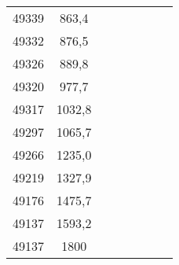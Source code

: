 \documentclass[11pt]{article}
\begin{document}
{{\begin{tabular}{|c|c|c|c|c|c|c|c|}
            \cline{1-2} 
            49339 & 863,4 &  & \multicolumn{1}{c}{} & \multicolumn{1}{c}{} & \multicolumn{1}{c}{} &  & \tabularnewline
            \cline{1-2} 
            49332 & 876,5 &  & \multicolumn{1}{c}{} & \multicolumn{1}{c}{} & \multicolumn{1}{c}{} &  & \tabularnewline
            \cline{1-2} 
            49326 & 889,8 &  & \multicolumn{1}{c}{} & \multicolumn{1}{c}{} & \multicolumn{1}{c}{} &  & \tabularnewline
            \cline{1-2} 
            49320 & 977,7 &  & \multicolumn{1}{c}{} & \multicolumn{1}{c}{} & \multicolumn{1}{c}{} &  & \tabularnewline
            \cline{1-2} 
            49317 & 1032,8 &  & \multicolumn{1}{c}{} & \multicolumn{1}{c}{} & \multicolumn{1}{c}{} &  & \tabularnewline
            \cline{1-2} 
            49297 & 1065,7 &  & \multicolumn{1}{c}{} & \multicolumn{1}{c}{} & \multicolumn{1}{c}{} &  & \tabularnewline
            \cline{1-2} 
            49266 & 1235,0 &  & \multicolumn{1}{c}{} & \multicolumn{1}{c}{} & \multicolumn{1}{c}{} &  & \tabularnewline
            \cline{1-2} 
            49219 & 1327,9 &  & \multicolumn{1}{c}{} & \multicolumn{1}{c}{} & \multicolumn{1}{c}{} &  & \tabularnewline
            \cline{1-2} 
            49176 & 1475,7 &  & \multicolumn{1}{c}{} & \multicolumn{1}{c}{} & \multicolumn{1}{c}{} &  & \tabularnewline
            \cline{1-2} 
            49137 & 1593,2 &  & \multicolumn{1}{c}{} & \multicolumn{1}{c}{} & \multicolumn{1}{c}{} &  & \tabularnewline
            \cline{1-2} 
            49137 & 1800 &  & \multicolumn{1}{c}{} & \multicolumn{1}{c}{} & \multicolumn{1}{c}{} &  & \tabularnewline
            \cline{1-2} 
        \end{tabular}
    }
}
\vspace*{\fill}\vspace*{\fill}
\end{document}
